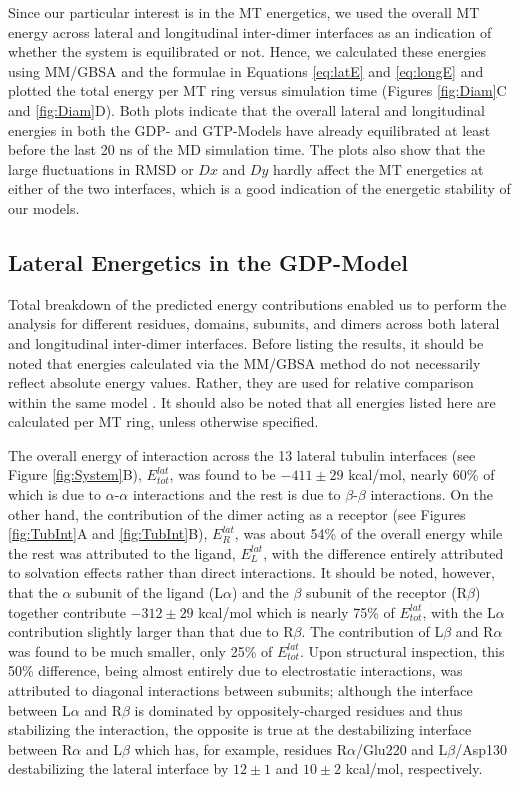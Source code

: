 \documentclass[11pt]{report}
\begin{document}
Since our particular interest is in the MT energetics, we used the overall
MT energy across lateral and longitudinal inter-dimer interfaces as an 
indication of whether the system is equilibrated or not.
Hence, we calculated these energies using MM/GBSA and the
formulae in Equations \ref{eq:latE} and \ref{eq:longE} and plotted the
total energy per MT ring versus simulation time (Figures \ref{fig:Diam}C and \ref{fig:Diam}D).
Both plots indicate that the overall lateral and longitudinal 
energies in both the
GDP- and GTP-Models have already equilibrated at least before
the last 20 ns of the MD simulation time.
The plots also show that the large fluctuations in RMSD or $Dx$ and $Dy$
hardly affect the MT energetics at either of the two interfaces, which is
a good indication of the energetic
stability of our models.

\subsection{Lateral Energetics in the GDP-Model}

Total breakdown of the predicted energy contributions enabled us to perform
the analysis
for different residues, domains, subunits, and dimers
across both lateral and longitudinal inter-dimer interfaces.
Before listing the results, it should be noted that
energies calculated via the MM/GBSA method do not
necessarily reflect absolute energy values. Rather,
they are used for relative comparison within the same
model \cite{Hou2011}. It should also be noted
that all energies listed here are calculated per MT ring, unless
otherwise specified.

The overall energy of interaction across the 13 lateral
tubulin interfaces (see Figure \ref{fig:System}B), $E_{tot}^{lat}$, was found to be
$-411\pm29$ kcal/mol, nearly 60\% of which is due
to $\alpha$-$\alpha$ interactions and the rest
is due to $\beta$-$\beta$ interactions.
On the other hand, the contribution of the dimer
acting as a receptor (see Figures \ref{fig:TubInt}A and \ref{fig:TubInt}B), $E_{R}^{lat}$, was about 54\%
of the overall energy while the rest
was attributed to the ligand, $E_{L}^{lat}$, with
the difference entirely attributed to solvation
effects rather than direct interactions. It should be noted,
however, that the $\alpha$ subunit of the ligand (L$\alpha$)
and the $\beta$ subunit of the receptor (R$\beta$) together
contribute $-312\pm29$ kcal/mol which is nearly
75\% of $E_{tot}^{lat}$, with the L$\alpha$ contribution slightly 
larger than that due to R$\beta$. The contribution of L$\beta$ and R$\alpha$
was found to be much smaller, only 25\% of $E_{tot}^{lat}$. Upon structural inspection, this 50\% difference, being almost entirely due to electrostatic interactions, was attributed to diagonal interactions
between subunits; although the interface between 
L$\alpha$ and R$\beta$ is dominated by oppositely-charged residues and thus stabilizing the interaction, the opposite is true at the destabilizing
interface between R$\alpha$ and L$\beta$ which has, for 
example,
residues R$\alpha$/Glu220 and L$\beta$/Asp130 destabilizing the lateral interface by 
$12\pm1$ and $10\pm2$ kcal/mol, respectively.
\end{document}
